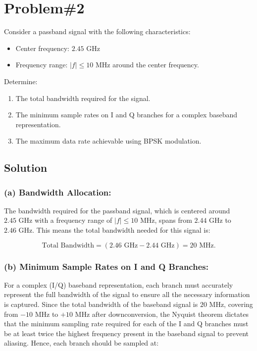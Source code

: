 \documentclass[12pt]{article}
\begin{document}
\section*{Problem\#2}

Consider a passband signal with the following characteristics:
\begin{itemize}
    \item Center frequency: $2.45 \text{ GHz}$
    \item Frequency range: $|f| \leq 10 \text{ MHz}$ around the center frequency.
\end{itemize}
\noindent
Determine:
\begin{enumerate}
    \item[(a)] The total bandwidth required for the signal.
    \item[(b)] The minimum sample rates on I and Q branches for a complex baseband representation.
    \item[(c)] The maximum data rate achievable using BPSK modulation.
\end{enumerate}

\subsection*{Solution}

\subsubsection*{(a) Bandwidth Allocation:}

The bandwidth required for the passband signal, which is centered around $2.45 \text{ GHz}$ with a frequency range of $|f| \leq 10 \text{ MHz}$, spans from $2.44 \text{ GHz}$ to $2.46 \text{ GHz}$. This means the total bandwidth needed for this signal is:

\[
\text{Total Bandwidth} = (2.46 \text{ GHz} - 2.44 \text{ GHz}) = 20 \text{ MHz}.
\]

\subsubsection*{(b) Minimum Sample Rates on I and Q Branches:}

For a complex (I/Q) baseband representation, each branch must accurately represent the full bandwidth of the signal to ensure all the necessary information is captured. Since the total bandwidth of the baseband signal is $20 \text{ MHz}$, covering from $-10 \text{ MHz}$ to $+10 \text{ MHz}$ after downconversion, the Nyquist theorem dictates that the minimum sampling rate required for each of the I and Q branches must be at least twice the highest frequency present in the baseband signal to prevent aliasing. Hence, each branch should be sampled at:
\end{document}
